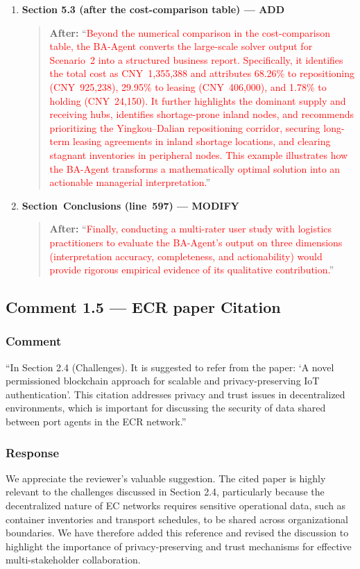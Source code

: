 \documentclass[11pt,a4paper]{article}
\begin{document}
\begin{enumerate}
\item \textbf{Section 5.3 (after the cost-comparison table) --- ADD}
\begin{quote}
\textbf{After:} ``\textcolor{red}{Beyond the numerical comparison in the cost-comparison table, the BA-Agent converts the large-scale solver output for Scenario~2 into a structured business report. Specifically, it identifies the total cost as CNY~1,355,388 and attributes 68.26\% to repositioning (CNY~925,238), 29.95\% to leasing (CNY~406,000), and 1.78\% to holding (CNY~24,150). It further highlights the dominant supply and receiving hubs, identifies shortage-prone inland nodes, and recommends prioritizing the Yingkou--Dalian repositioning corridor, securing long-term leasing agreements in inland shortage locations, and clearing stagnant inventories in peripheral nodes. This example illustrates how the BA-Agent transforms a mathematically optimal solution into an actionable managerial interpretation.}''
\end{quote}

\item \textbf{Section~Conclusions (line~597) --- MODIFY}
\begin{quote}
\textbf{After:} ``\textcolor{red}{Finally, conducting a multi-rater user study with logistics practitioners to evaluate the BA-Agent's output on three dimensions (interpretation accuracy, completeness, and actionability) would provide rigorous empirical evidence of its qualitative contribution.}''
\end{quote}
\end{enumerate}

\subsection{Comment 1.5 --- ECR paper Citation}

\subsubsection{Comment}
``In Section 2.4 (Challenges). It is suggested to refer from the paper: `A novel permissioned blockchain approach for scalable and privacy-preserving IoT authentication'. This citation addresses privacy and trust issues in decentralized environments, which is important for discussing the security of data shared between port agents in the ECR network.''

\subsubsection{Response}
We appreciate the reviewer’s valuable suggestion. The cited paper is highly relevant to the challenges discussed in Section 2.4, particularly because the decentralized nature of EC networks requires sensitive operational data, such as container inventories and transport schedules, to be shared across organizational boundaries. We have therefore added this reference and revised the discussion to highlight the importance of privacy-preserving and trust mechanisms for effective multi-stakeholder collaboration.
\end{document}
